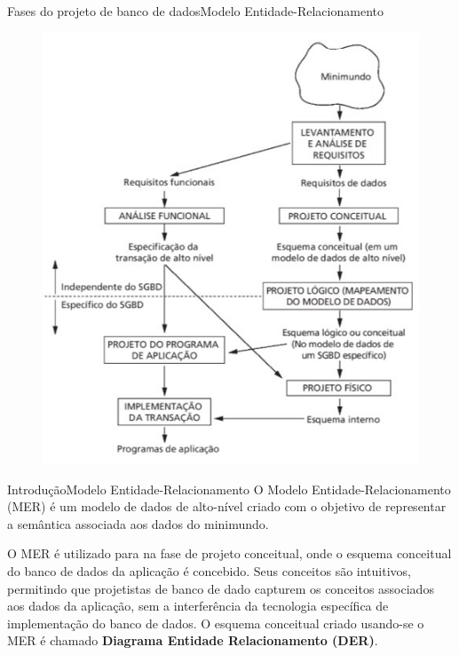 \documentclass[t]{beamer}
\begin{document}


\begin{ftst}{Fases do projeto de banco de dados}{Modelo Entidade-Relacionamento}
\begin{figure}
    \centering
    \includegraphics[scale=0.5]{Figuras/01_1.jpg}
\end{figure}

\end{ftst}


\begin{ftst}{Introdução}{Modelo Entidade-Relacionamento}
\small
\vone
O Modelo Entidade-Relacionamento (MER) é um modelo de dados de alto-nível criado com o objetivo de representar a semântica associada aos dados do minimundo.
\vone 

O MER é utilizado para na fase de projeto conceitual, onde o esquema conceitual do
banco de dados da aplicação é concebido.
\vone
Seus conceitos são intuitivos, permitindo que projetistas de banco de dado capturem os conceitos associados aos dados da aplicação, sem a interferência da tecnologia específica de implementação do banco de dados. 
\vone
O esquema conceitual criado usando-se o MER é chamado \textbf{Diagrama Entidade Relacionamento (DER)}.

\end{ftst}
\end{document}
